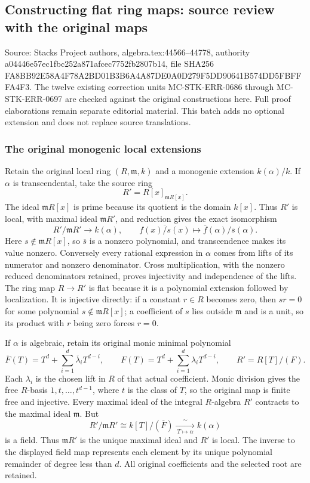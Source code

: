 \subsection{Constructing flat ring maps: source review with the original maps}\label{algebra-proof-064-constructing-flat-ring-maps-source-review-with-the-original-maps}

Source: Stacks Project authors, algebra.tex:44566--44778, authority a04446e57ec1fbc252a871afcec7752fb2807b14, file SHA256 FA8BB92E58A4F78A2BD01B3B6A4A87DE0A0D279F5DD90641B574DD5FBFFFA4F3. The twelve existing correction units MC-STK-ERR-0686 through MC-STK-ERR-0697 are checked against the original constructions here. Full proof elaborations remain separate editorial material. This batch adds no optional extension and does not replace source translations.

\subsubsection{The original monogenic local extensions}\label{algebra-proof-064-the-original-monogenic-local-extensions}

Retain the original local ring \((R,\mathfrak m,k)\) and a monogenic extension \(k(\alpha)/k\). If \(\alpha\) is transcendental, take the source ring \[
 R'=R[x]_{\mathfrak mR[x]}.
\] The ideal \(\mathfrak mR[x]\) is prime because its quotient is the domain \(k[x]\). Thus \(R'\) is local, with maximal ideal \(\mathfrak mR'\), and reduction gives the exact isomorphism \[
 R'/\mathfrak mR'\longrightarrow k(\alpha),\qquad
 \overline{f(x)/s(x)}\longmapsto \overline f(\alpha)/\overline s(\alpha).
\] Here \(s\notin\mathfrak mR[x]\), so \(\overline s\) is a nonzero polynomial, and transcendence makes its value nonzero. Conversely every rational expression in \(\alpha\) comes from lifts of its numerator and nonzero denominator. Cross multiplication, with the nonzero reduced denominators retained, proves injectivity and independence of the lifts. The ring map \(R\to R'\) is flat because it is a polynomial extension followed by localization. It is injective directly: if a constant \(r\in R\) becomes zero, then \(sr=0\) for some polynomial \(s\notin\mathfrak mR[x]\); a coefficient of \(s\) lies outside \(\mathfrak m\) and is a unit, so its product with \(r\) being zero forces \(r=0\).

If \(\alpha\) is algebraic, retain its original monic minimal polynomial \[
 \overline F(T)=T^d+\sum_{i=1}^{d}\overline\lambda_iT^{d-i},
 \qquad
 F(T)=T^d+\sum_{i=1}^{d}\lambda_iT^{d-i},
 \qquad R'=R[T]/(F).
\] Each \(\lambda_i\) is the chosen lift in \(R\) of that actual coefficient. Monic division gives the free \(R\)-basis \(1,t,\ldots,t^{d-1}\), where \(t\) is the class of \(T\), so the original map is finite free and injective. Every maximal ideal of the integral \(R\)-algebra \(R'\) contracts to the maximal ideal \(\mathfrak m\). But \[
 R'/\mathfrak mR'\cong k[T]/(\overline F)
       \xrightarrow[\ T\mapsto\alpha\ ]{\ \sim\ } k(\alpha)
\] is a field. Thus \(\mathfrak mR'\) is the unique maximal ideal and \(R'\) is local. The inverse to the displayed field map represents each element by its unique polynomial remainder of degree less than \(d\). All original coefficients and the selected root are retained.

